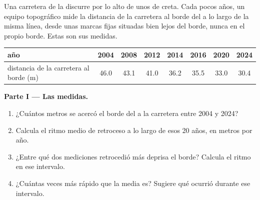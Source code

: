 \begin{problem}
\label{pb:g9:landforms:1}
Una carretera de la  discurre por lo alto de unos  de
creta. Cada pocos años, un equipo topográfico mide la distancia de la
carretera al borde del  a lo largo de la misma línea, desde
unas marcas fijas situadas bien lejos del borde, nunca en el propio borde.
Estas son sus medidas.

\begin{center}
{\small
\begin{tabular}{|l|c|c|c|c|c|c|c|}
\hline
año & 2004 & 2008 & 2012 & 2014 & 2016 & 2020 & 2024 \\
\hline
distancia de la carretera al borde (m) & 46.0 & 43.1 & 41.0 & 36.2 & 35.5 & 33.0 & 30.4 \\
\hline
\end{tabular}}
\end{center}

\noindent\textbf{Parte I --- Las medidas.}\par\nopagebreak
\begin{enumerate}[beginpenalty=10000]
  \item ¿Cuántos metros se acercó el borde del  a la carretera
        entre 2004 y 2024?
  \item Calcula el ritmo medio de retroceso a lo largo de esos 20 años, en
        metros por año.
  \item ¿Entre qué dos mediciones retrocedió más deprisa el borde? Calcula
        el ritmo en ese intervalo.
  \item ¿Cuántas veces más rápido que la media es? Sugiere qué ocurrió
        durante ese intervalo.
\end{enumerate}

\begin{omfigure}


\end{omfigure}
\end{problem}
